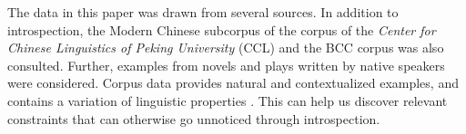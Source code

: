 The data in this paper was drawn from several sources.
In addition to introspection, the Modern Chinese subcorpus of the corpus of the \textit{Center for Chinese Linguistics of Peking University} ({CCL}) \citep{Zhanetal2003, Zhanetal2019} and the BCC corpus \citep{BCC} was also consulted. 
Further, examples from novels and plays written by native speakers were considered.
Corpus data provides natural and contextualized examples, and contains a variation of linguistic properties \citep[921]{MM2009a}.
This can help us discover relevant constraints that can otherwise go unnoticed through introspection.